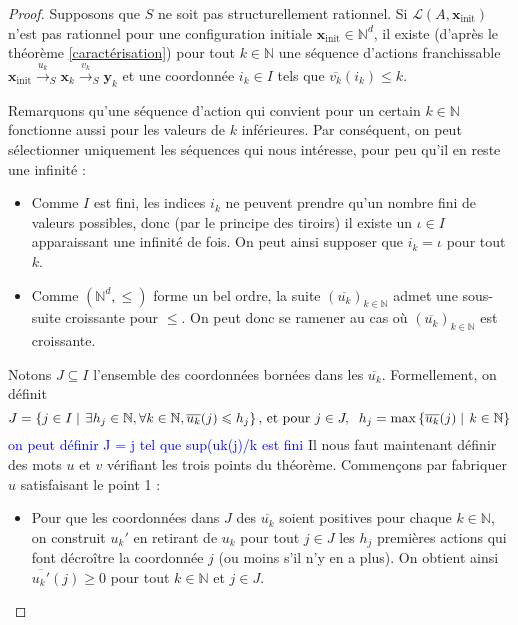 \documentclass[a4paper,final]{article}
\theoremstyle{definition}
\let\leq\leqslant
\let\geq\geqslant
\newcommand{\alain}[1]{\textcolor{blue}{#1}}
\newcommand{\set}[2]{\left\{#1\mathrel{\left|\vphantom{#1}\vphantom{#2}\right.}#2\right\}}
\newcommand{\N}{\ensuremath{\mathbb{N}}}
\newcommand{\lang}{\ensuremath{\mathcal{L}}}
\newcommand{\trans}[2]{\ensuremath{\stackrel{#1}{\longrightarrow}_{#2}}}
\newcommand{\vect}[1]{\ensuremath{\mathbf{#1}}}
\newcommand{\xinit}{\ensuremath{\vect{x}_\text{init}}}
\newcommand{\valeur}[1]{\ensuremath{\overline{#1}}}
\begin{document}
\begin{proof}
Supposons que $S$ ne soit pas structurellement rationnel.
Si $\lang(A,\xinit)$ n'est pas rationnel pour une configuration initiale $\xinit \in\N^d$, il existe (d'après le théorème \ref{caractérisation}) pour tout $k\in\N$ une séquence d'actions franchissable 
$\xinit \trans{u_k}{S} \vect{x}_k \trans{v_k}{S} \vect{y}_k$
et une coordonnée $i_k \in I$ tels que $\valeur{v_k}(i_k) \leq k$.

Remarquons qu'une séquence d'action qui convient pour un certain $k\in\N$ fonctionne aussi pour les valeurs de $k$ inférieures.
Par conséquent, on peut sélectionner uniquement les séquences qui nous intéresse, pour peu qu'il  en reste une infinité :

\begin{itemize}
    \item Comme $I$ est fini, les indices $i_k$ ne peuvent prendre qu'un nombre fini de valeurs possibles, donc (par le principe des tiroirs) il existe un $\iota\in I$ apparaissant une infinité de fois.
    On peut ainsi supposer que $i_k = \iota$ pour tout $k$.
    
    \item Comme $(\N^d,\leq)$ forme un bel ordre, la suite $(\valeur{u_k})_{k\in\N}$ admet une sous-suite croissante pour $\leq$.
    On peut donc se ramener au cas où $(\valeur{u_k})_{k\in\N}$ est croissante.
\end{itemize}

Notons $J\subseteq I$ l'ensemble des coordonnées bornées dans les $\valeur{u_k}$.
Formellement, on définit 
$$J = \set{j\in I}{\exists h_j\in\N, \forall k\in\N, \valeur{u_k}(j) \leq h_j}
\text{, et pour } j\in J,\hspace{2mm} h_j = \max \set{\valeur{u_k}(j)}{k\in\N}$$
\alain{on peut définir J = j tel que sup{(uk(j)/k} est fini }
Il nous faut maintenant définir des mots $u$ et $v$ vérifiant les trois points du théorème.
Commençons par fabriquer $u$ satisfaisant le point 1 :
\begin{itemize}
    \item Pour que les coordonnées dans $J$ des $\valeur{u_k}$ soient positives pour chaque $k\in\N$, 
    on construit $u_k'$ en retirant de $u_k$ pour tout $j\in J$ les $h_j$ premières actions qui font décroître la coordonnée $j$ (ou moins s'il n'y en a plus).
    On obtient ainsi $\valeur{u_k'}(j) \geq 0$ pour tout $k\in\N$ et $j\in J$.
    

\end{itemize}
\end{proof}
\end{document}
